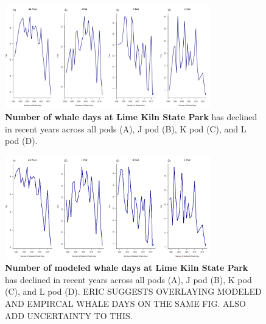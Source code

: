 \documentclass{article}
\begin{document}
\begin{figure}[p]
\includegraphics[width=0.8\textwidth]{../analyses/orcaphen/figures/whaledays_lime.png} 
\caption{\textbf{Number of whale days at Lime Kiln State Park} has declined in recent years across all pods (A), J pod (B), K pod (C), and L pod (D). }
\label{fig:limewdays}
\end{figure}
\begin{figure}[p]
\includegraphics[width=0.8\textwidth]{../analyses/orcaphen/figures/modwhaledays_lime.png} 
\caption{\textbf{Number of modeled whale days at Lime Kiln State Park} has declined in recent years across all pods (A), J pod (B), K pod (C), and L pod (D). ERIC SUGGESTS OVERLAYING MODELED AND EMPIRCAL WHALE DAYS ON THE SAME FIG. ALSO ADD UNCERTAINTY TO THIS.}
\label{fig:mlimewdays}
\end{figure}
\newpage
\end{document}
